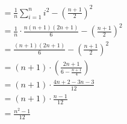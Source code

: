 \documentclass[11pt]{report}
\begin{document}
\begin{itemize}
\begin{equation}
\begin{split}
            & = \frac{1}{n} \sum_{i=1}^n i^2 - \left(\frac{n+1}{2}\right)^2\\
            & = \frac{1}{n} \cdot \frac{n(n+1)(2n+1)}{6} - \left(\frac{n+1}{2}\right)^2\\
            & = \frac{(n+1)(2n+1)}{6} - \left(\frac{n+1}{2}\right)^2\\
            & = (n+1) \cdot \left(\frac{2n+1}{6 - \frac{n+1}{4}}\right)\\
            & = (n+1) \cdot \frac{4n+2-3n-3}{12}\\
            & = (n+1) \cdot \frac{n-1}{12}\\
   			& = \frac{n^2-1}{12}
		\end{split}
    \end{equation}
\end{itemize}
\begin{center}
    
\end{center}
\begin{center}
    
\end{center}
\begin{center}
    
\end{center}
\end{document}
